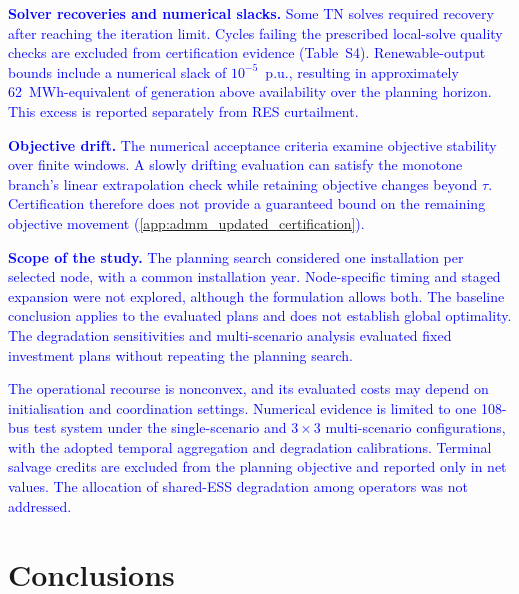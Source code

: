 \documentclass[preprint,12pt]{elsarticle}
\begin{document}
\textcolor{blue}{
    \textbf{Solver recoveries and numerical slacks.} Some TN solves required recovery after reaching the iteration limit. Cycles failing the prescribed local-solve quality checks are excluded from certification evidence (Table~S4). Renewable-output bounds include a numerical slack of $10^{-5}$~p.u., resulting in approximately 62~MWh-equivalent of generation above availability over the planning horizon. This excess is reported separately from RES curtailment.
}

\textcolor{blue}{
    \textbf{Objective drift.} The numerical acceptance criteria examine objective stability over finite windows. A slowly drifting evaluation can satisfy the monotone branch's linear extrapolation check while retaining objective changes beyond $\tau$. Certification therefore does not provide a guaranteed bound on the remaining objective movement (\ref{app:admm_updated_certification}).
}

\textcolor{blue}{
    \textbf{Scope of the study.} The planning search considered one installation per selected node, with a common installation year. Node-specific timing and staged expansion were not explored, although the formulation allows both. The baseline conclusion applies to the evaluated plans and does not establish global optimality. The degradation sensitivities and multi-scenario analysis evaluated fixed investment plans without repeating the planning search.
}

\textcolor{blue}{
    The operational recourse is nonconvex, and its evaluated costs may depend on initialisation and coordination settings. Numerical evidence is limited to one 108-bus test system under the single-scenario and $3 \times 3$ multi-scenario configurations, with the adopted temporal aggregation and degradation calibrations. Terminal salvage credits are excluded from the planning objective and reported only in net values. The allocation of shared-ESS degradation among operators was not addressed.
}

\section{Conclusions}
\label{sec:conclusions}
\end{document}
